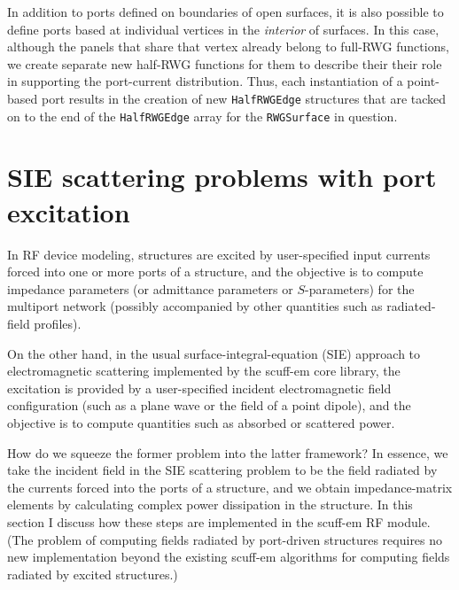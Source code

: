 \documentclass[letterpaper]{article}
\begin{document}
In addition to ports defined on boundaries of open surfaces, it is
also possible to define ports based at individual vertices
in the \textit{interior} of surfaces. In this case, although the panels
that share that vertex already belong to full-RWG functions,
we create separate new half-RWG functions for them to describe 
their their role in supporting the port-current distribution.
Thus, each instantiation of a point-based port results in the 
creation of new \texttt{HalfRWGEdge} structures that are tacked on 
to the end of the \texttt{HalfRWGEdge} array for the \texttt{RWGSurface}
in question.

\newpage

\section{SIE scattering problems with port excitation}
\label{SIEWithPortExcitationSection}

In RF device modeling, structures are excited by user-specified input currents
forced into one or more ports of a structure, and the objective is to compute
impedance parameters (or admittance parameters or $S$-parameters) for the 
multiport network (possibly accompanied by other quantities such as 
radiated-field profiles).

On the other hand, in the usual surface-integral-equation (SIE)
approach to electromagnetic scattering implemented by the {\sc scuff-em}
core library, the excitation is provided by a user-specified
incident electromagnetic field configuration (such as a plane wave
or the field of a point dipole),
and the objective is to compute quantities such as absorbed or scattered
power.

How do we squeeze the former problem into the latter framework?
In essence, we take the incident field in the SIE scattering problem
to be the field radiated by the currents forced into the ports
of a structure, and we obtain impedance-matrix elements by calculating
complex power dissipation in the structure.
In this section I discuss how these steps are implemented
in the {\sc scuff-em} RF module.
(The problem of computing fields radiated by port-driven structures
requires no new implementation beyond the existing {\sc scuff-em} 
algorithms for computing fields radiated by excited structures.)
\end{document}
